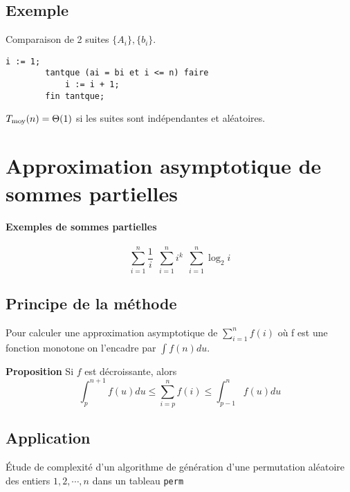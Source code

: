 	\subsection{Exemple}
	Comparaison de 2 suites $\{A_i\},\{b_i\}$.
	\begin{lstlisting}[language=algo]
		i := 1;
		tantque (ai = bi et i <= n) faire
			i := i + 1;
		fin tantque;
	\end{lstlisting}
	$T_{\moy}(n) = \Theta(1)$ si les suites sont indépendantes et aléatoires.
	\section{Approximation asymptotique de sommes partielles}
	\paragraph{Exemples de sommes partielles}
	$$\sum^n_{i=1}\frac{1}{i}\ \ \sum^n_{i=1} i^k\ \  \sum^n_{i=1} \log_2 i$$
	\subsection{Principe de la méthode}
	Pour calculer une approximation asymptotique de $\sum^n_{i=1} f(i)$ où f est une fonction monotone on l'encadre par $\int f(n)du$.

	\textbf{Proposition } Si $f$ est décroissante, alors 
	$$ \int^{n+1}_p f(u)du \leq \sum^n_{i=p} f(i) \leq \int^n_{p-1} f(u)du$$



	\subsection{Application} Étude de complexité d'un algorithme de génération d'une permutation aléatoire des entiers $1,2,\cdots,n$ dans un tableau \texttt{perm}

